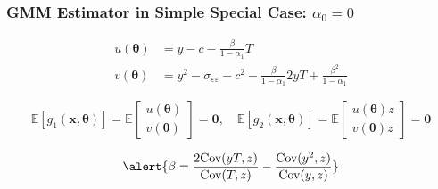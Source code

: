 \documentclass{beamer}
\begin{document}
\begin{frame}
  \frametitle{GMM Estimator in Simple Special Case: $\alpha_0 = 0$}

  \vspace{-2em}

\begin{align*}
  u(\boldsymbol{\theta}) &= y - c - \frac{\beta}{1 - \alpha_1} T\\
  v(\boldsymbol{\theta}) &= y^2 - \sigma_{\varepsilon\varepsilon} - c^2 - \frac{\beta}{1 - \alpha_1} 2yT + \frac{\beta^2}{1 - \alpha_1}
\end{align*}

\vspace{-1em}

\[
  \mathbb{E}\left[ g_1(\mathbf{x}, \boldsymbol{\theta}) \right] = \mathbb{E}
  \left[
  \begin{array}{c}
    u(\boldsymbol{\theta})\\ v(\boldsymbol{\theta})
  \end{array}
\right] = \mathbf{0}, \quad
\mathbb{E}\left[ g_2(\mathbf{x}, \boldsymbol{\theta}) \right] = \mathbb{E}
  \left[
  \begin{array}{c}
    u(\boldsymbol{\theta}) z\\ v(\boldsymbol{\theta}) z
  \end{array}
\right] = \mathbf{0}
\]

  \[
    \alert{\beta = \frac{2\mbox{Cov}(yT,z)}{\mbox{Cov}(T,z)} - \frac{\mbox{Cov}(y^2,z)}{\mbox{Cov}(y,z)}}
  \]

\end{frame}
\end{document}
